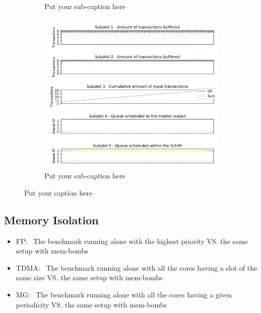\begin{figure}
\begin{subfigure}{.3\textwidth}
        \caption{Put your sub-caption here}
        \label{fig:schim_behaviour_tdma}
      \end{subfigure}
      \hfill
      \begin{subfigure}{.3\textwidth}
        \centering
        \includegraphics[scale=0.32]{../doc/experiments/buffering_4c_15_08_MG.png}  
        \caption{Put your sub-caption here}
        \label{fig:schim_behaviour_mg}
      \end{subfigure}
      \caption{Put your caption here}
      \label{fig:schim_behaviour}
    \end{figure}
    
  \subsection{Memory Isolation}
    \begin{itemize}
      \item FP:~ The benchmark running alone with the highest priority VS. the same setup with mem-bombs
      \item TDMA:~ The benchmark running alone with all the cores having a slot of the same size VS. the same setup with mem-bombs
      \item MG:~ The benchmark running alone with all the cores having a given periodicity VS. the same setup with mem-bombs
    \end{itemize}
